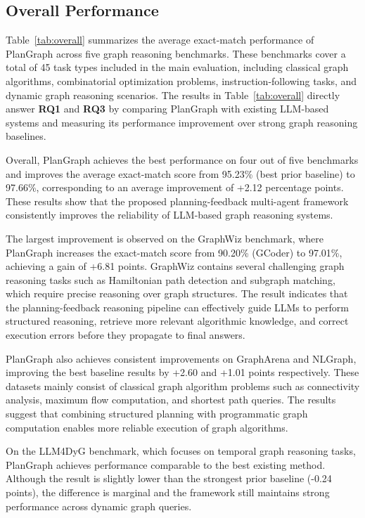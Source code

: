 \documentclass[sigconf,review,anonymous]{acmart}
\begin{document}
\subsection{Overall Performance}

Table~\ref{tab:overall} summarizes the average exact-match performance of
PlanGraph across five graph reasoning benchmarks. These
benchmarks cover a total of 45 task types included in the main evaluation, including
classical graph algorithms, combinatorial optimization
problems, instruction-following tasks, and dynamic graph
reasoning scenarios. The results in Table~\ref{tab:overall}
directly answer \textbf{RQ1} and \textbf{RQ3} by comparing
PlanGraph with existing LLM-based systems and measuring
its performance improvement over strong graph reasoning
baselines.

Overall, PlanGraph achieves the best performance on four
out of five benchmarks and improves the average exact-match
score from 95.23\% (best prior baseline) to 97.66\%, corresponding
to an average improvement of +2.12 percentage points.
These results show that the proposed planning-feedback
multi-agent framework consistently improves the reliability
of LLM-based graph reasoning systems.

The largest improvement is observed on the GraphWiz
benchmark, where PlanGraph increases the exact-match score from
90.20\% (GCoder) to 97.01\%, achieving a gain of
+6.81 points. GraphWiz contains several challenging
graph reasoning tasks such as Hamiltonian path detection
and subgraph matching, which require precise reasoning
over graph structures. The result indicates that the
planning-feedback reasoning pipeline can effectively guide
LLMs to perform structured reasoning, retrieve more relevant
algorithmic knowledge, and correct execution errors before
they propagate to final answers.

PlanGraph also achieves consistent improvements on
GraphArena and NLGraph, improving the best baseline
results by +2.60 and +1.01 points respectively.
These datasets mainly consist of classical graph
algorithm problems such as connectivity analysis,
maximum flow computation, and shortest path queries.
The results suggest that combining structured planning
with programmatic graph computation enables more reliable
execution of graph algorithms.

On the LLM4DyG benchmark, which focuses on temporal
graph reasoning tasks, PlanGraph achieves performance
comparable to the best existing method. Although the
result is slightly lower than the strongest prior baseline
(-0.24 points), the difference is marginal and the
framework still maintains strong performance across
dynamic graph queries.
\end{document}
